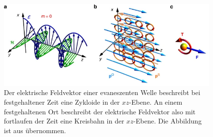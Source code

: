 \documentclass[a4paper, titlepage,  ngerman]{book}
\begin{document}
	\begin{figure}
		\centering
		\includegraphics[width=0.7\linewidth]{figures/spin/ev_spin}
		\caption[Drehimpuls von evaneszenter EM-Welle]{Der elektrische Feldvektor einer evaneszenten Welle beschreibt bei festgehaltener Zeit eine Zykloide in der $xz$-Ebene. An einem festgehaltenen Ort beschreibt der elektrische Feldvektor also mit fortlaufen der Zeit eine Kreisbahn in der $xz$-Ebene. Die Abbildung ist aus \cite{Bliokh.2014} übernommen.}
		\label{fig:ev_spin}
	\end{figure}
\end{document}
